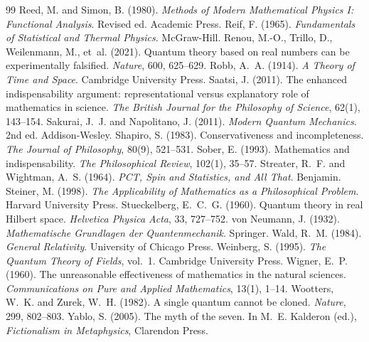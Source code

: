 \documentclass{situationist-preprint}
\begin{document}
\begin{thebibliography}{99}
 Reed, M. and Simon, B. (1980). \emph{Methods of Modern Mathematical Physics I: Functional Analysis}. Revised ed. Academic Press.
 Reif, F. (1965). \emph{Fundamentals of Statistical and Thermal Physics}. McGraw-Hill.
 Renou, M.-O., Trillo, D., Weilenmann, M., et~al. (2021). Quantum theory based on real numbers can be experimentally falsified. \emph{Nature}, 600, 625--629.
 Robb, A.~A. (1914). \emph{A Theory of Time and Space}. Cambridge University Press.
 Saatsi, J. (2011). The enhanced indispensability argument: representational versus explanatory role of mathematics in science. \emph{The British Journal for the Philosophy of Science}, 62(1), 143--154.
 Sakurai, J.~J. and Napolitano, J. (2011). \emph{Modern Quantum Mechanics}. 2nd ed. Addison-Wesley.
 Shapiro, S. (1983). Conservativeness and incompleteness. \emph{The Journal of Philosophy}, 80(9), 521--531.
 Sober, E. (1993). Mathematics and indispensability. \emph{The Philosophical Review}, 102(1), 35--57.
 Streater, R.~F. and Wightman, A.~S. (1964). \emph{PCT, Spin and Statistics, and All That}. Benjamin.
 Steiner, M. (1998). \emph{The Applicability of Mathematics as a Philosophical Problem}. Harvard University Press.
 Stueckelberg, E.~C.~G. (1960). Quantum theory in real Hilbert space. \emph{Helvetica Physica Acta}, 33, 727--752.
 von Neumann, J. (1932). \emph{Mathematische Grundlagen der Quantenmechanik}. Springer.
 Wald, R.~M. (1984). \emph{General Relativity}. University of Chicago Press.
 Weinberg, S. (1995). \emph{The Quantum Theory of Fields}, vol.~1. Cambridge University Press.
 Wigner, E.~P. (1960). The unreasonable effectiveness of mathematics in the natural sciences. \emph{Communications on Pure and Applied Mathematics}, 13(1), 1--14.
 Wootters, W.~K. and Zurek, W.~H. (1982). A single quantum cannot be cloned. \emph{Nature}, 299, 802--803.
 Yablo, S. (2005). The myth of the seven. In M.~E. Kalderon (ed.), \emph{Fictionalism in Metaphysics}, Clarendon Press.
\end{thebibliography}
\end{document}

